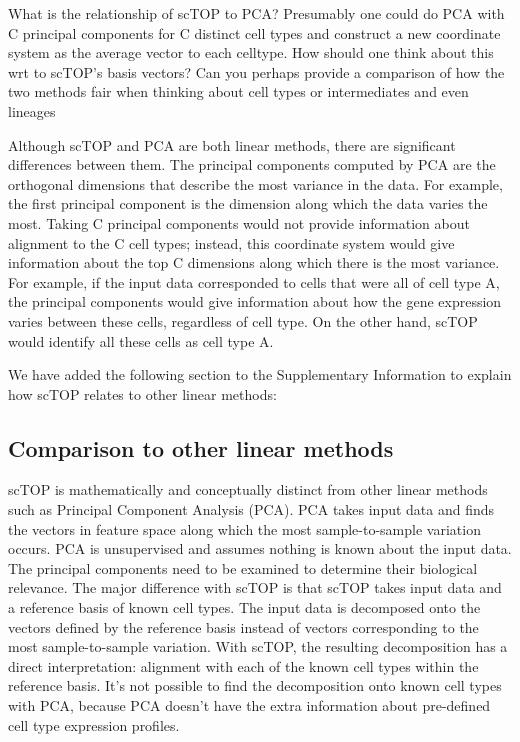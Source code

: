 \documentclass[12pt,american]{scrartcl}
\begin{document}
\begin{revcomment}
	What is the relationship of scTOP to PCA? Presumably one could do PCA with C principal components for C distinct cell types and construct a new coordinate system as the average vector to each celltype. How should one think about this wrt to scTOP’s basis vectors? Can you perhaps provide a comparison of how the two methods fair when thinking about cell types or intermediates and even lineages
\end{revcomment}
\begin{revresponse}
 Although scTOP and PCA are both linear methods, there are significant differences between them. The principal components computed by PCA are the orthogonal dimensions that describe the most variance in the data. For example, the first principal component is the dimension along which the data varies the most. Taking C principal components would not provide information about alignment to the C cell types; instead, this coordinate system would give information about the top C dimensions along which there is the most variance. For example, if the input data corresponded to cells that were all of cell type A, the principal components would give information about how the gene expression varies between these cells, regardless of cell type. On the other hand, scTOP would identify all these cells as cell type A.

 We have added the following section to the Supplementary Information to explain how scTOP relates to other linear methods:
	\begin{changes}
		\subsection*{Comparison to other linear methods}
          scTOP is mathematically and conceptually distinct from other linear methods such as Principal Component Analysis (PCA). PCA takes input data and finds the vectors in feature space along which the most sample-to-sample variation occurs. PCA is unsupervised and assumes nothing is known about the input data. The principal components need to be examined to determine their biological relevance. The major difference with scTOP is that scTOP takes input data and a reference basis of known cell types. The input data is decomposed onto the vectors defined by the reference basis instead of vectors corresponding to the most sample-to-sample variation. With scTOP, the resulting decomposition has a direct interpretation: alignment with each of the known cell types within the reference basis. It’s not possible to find the decomposition onto known cell types with PCA, because PCA doesn’t have the extra information about pre-defined cell type expression profiles. 


\end{changes}
\end{revresponse}
\end{document}
